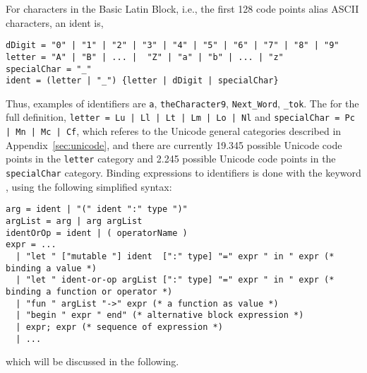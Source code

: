 For characters in the Basic Latin Block, i.e., the first 128 code points alias ASCII characters, an ident is,
%
\begin{lstlisting}[language=EBNF]
dDigit = "0" | "1" | "2" | "3" | "4" | "5" | "6" | "7" | "8" | "9"
letter = "A" | "B" | ... |  "Z" | "a" | "b" | ... | "z"
specialChar = "_"
ident = (letter | "_") {letter | dDigit | specialChar}
\end{lstlisting}
%
Thus, examples of identifiers are \lstinline{a}, \lstinline{theCharacter9}, \lstinline{Next_Word}, \lstinline{_tok}. The for the full definition, \lstinline[language=EBNF]{letter = Lu | Ll | Lt | Lm | Lo | Nl} and \lstinline[language=EBNF]{specialChar = Pc | Mn | Mc | Cf}, which referes to the Unicode general categories described in Appendix~\ref{sec:unicode}, and there are currently 19.345 possible Unicode code points in the \lstinline[language=EBNF]{letter} category and 2.245 possible Unicode code points in the \lstinline[language=EBNF]{specialChar} category. 
Binding expressions to identifiers is done with the keyword , using the following simplified syntax:
%
\begin{lstlisting}[language=EBNF]
arg = ident | "(" ident ":" type ")"
argList = arg | arg argList
identOrOp = ident | ( operatorName )
expr = ... 
  | "let " ["mutable "] ident  [":" type] "=" expr " in " expr (* binding a value *)
  | "let " ident-or-op argList [":" type] "=" expr " in " expr (* binding a function or operator *)
  | "fun " argList "->" expr (* a function as value *)
  | "begin " expr " end" (* alternative block expression *)
  | expr; expr (* sequence of expression *)
  | ...
\end{lstlisting}
%
which will be discussed in the following.

